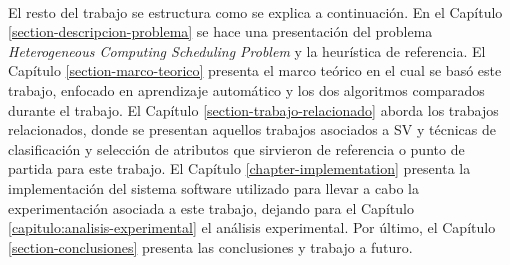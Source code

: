 \paragraph{} El resto del trabajo se estructura como se explica a continuación.
En el Capítulo \ref{section-descripcion-problema} se hace una presentación del problema \textit{Heterogeneous Computing Scheduling Problem} y la heurística de referencia. El Capítulo \ref{section-marco-teorico} presenta el marco teórico en el cual se basó este trabajo, enfocado en aprendizaje automático y los dos algoritmos comparados durante el trabajo.
El Capítulo \ref{section-trabajo-relacionado} aborda los trabajos relacionados, donde se presentan aquellos trabajos asociados a SV y técnicas de clasificación y selección de atributos que sirvieron de referencia o punto de partida para este trabajo.
El Capítulo \ref{chapter-implementation} presenta la implementación del sistema software utilizado para llevar a cabo la experimentación asociada a este trabajo, dejando para el Capítulo \ref{capitulo:analisis-experimental} el análisis experimental.
Por último, el Capítulo \ref{section-conclusiones} presenta las conclusiones y trabajo a futuro.